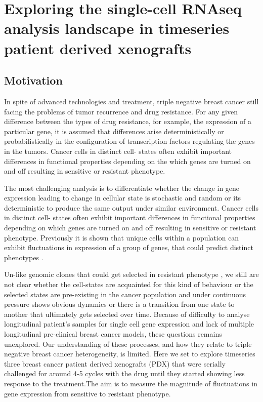 
{\chapter{Exploring the single-cell RNAseq analysis landscape in timeseries patient derived xenografts}

}
 \label{ch:Chapter5}
 \section{Motivation}

In spite of advanced technologies and treatment, triple negative breast cancer still facing the problems of tumor recurrence and drug resistance.
For any given difference between the types of drug resistance, for example, the expression of a particular gene, it is assumed that differences arise deterministically or probabilistically in the configuration of transcription factors regulating the genes in the tumors. Cancer cells in distinct cell- states often exhibit important differences in functional properties depending on the which genes are turned on and off resulting in sensitive or resistant phenotype.

The most challenging analysis is to differentiate whether the change in gene expression leading to change in cellular state is stochastic\cite{raj2008nature} and random or its deterministic to produce the same output under similar environment.
Cancer cells in distinct cell- states often exhibit important differences in functional properties depending on which genes are turned on and off resulting in sensitive  or resistant phenotype.
Previously it is shown that unique cells within a population can exhibit fluctuations in expression of a group of genes, that could predict distinct phenotypes \cite{shaffer2019memory}.

Un-like genomic clones that could get selected in resistant phenotype \cite{salehi2020single}, we still are not clear whether the cell-states are acquainted for this kind of behaviour or the selected states are pre-existing in the cancer population and under continuous pressure shows obvious dynamics or there is a transition from one state to another that ultimately gets selected over time. Because of difficulty to analyse longitudinal patient's samples for single cell gene expression and lack of multiple longitudinal pre-clinical breast cancer models, these questions remains unexplored. Our understanding of these processes, and how they relate to triple negative breast cancer heterogeneity, is limited.
Here we set to explore timeseries three breast cancer patient derived xenografts (PDX) that were serially challenged for around 4-5 cycles with the drug until they started showing less response to the treatment.The aim is to measure the magnitude of fluctuations in gene expression from sensitive to resistant phenotype.


